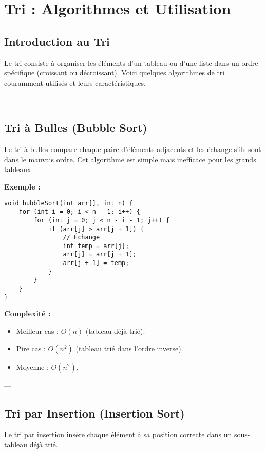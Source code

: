 \section{ Tri : Algorithmes et Utilisation}

\subsection{ Introduction au Tri}
Le tri consiste à organiser les éléments d'un tableau ou d'une liste dans un ordre spécifique (croissant ou décroissant). Voici quelques algorithmes de tri couramment utilisés et leurs caractéristiques.

---

\subsection{ Tri à Bulles (Bubble Sort)}
Le tri à bulles compare chaque paire d'éléments adjacents et les échange s'ils sont dans le mauvais ordre. Cet algorithme est simple mais inefficace pour les grands tableaux.

\textbf{Exemple :}
\begin{tcolorbox}[colframe=blue!50!black, colback=blue!5!white, title=Exemple d'Attributs et Méthodes Statistiques]
\begin{verbatim}
void bubbleSort(int arr[], int n) {
    for (int i = 0; i < n - 1; i++) {
        for (int j = 0; j < n - i - 1; j++) {
            if (arr[j] > arr[j + 1]) {
                // Échange
                int temp = arr[j];
                arr[j] = arr[j + 1];
                arr[j + 1] = temp;
            }
        }
    }
}
\end{verbatim}
\end{tcolorbox}

\textbf{Complexité :}
\begin{itemize}
    \item Meilleur cas : $O(n)$ (tableau déjà trié).
    \item Pire cas : $O(n^2)$ (tableau trié dans l'ordre inverse).
    \item Moyenne : $O(n^2)$.
\end{itemize}

---

\subsection{ Tri par Insertion (Insertion Sort)}
Le tri par insertion insère chaque élément à sa position correcte dans un sous-tableau déjà trié.


